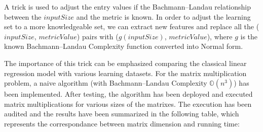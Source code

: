 A trick is used to adjust the entry values if the Bachmann–Landau relationship between the $inputSize$ and the metric is known. In order to adjust the learning set to a more knowledgeable set, we can extract new features and replace all the ($inputSize$, $metricValue$) pairs with ($g(inputSize)$, $metricValue$), where $g$ is the known Bachmann–Landau Complexity function converted into Normal form.


The importance of this trick can be emphasized comparing the classical linear regression model with various learning datasets. For the matrix multiplication problem, a naive algorithm (with Bachmann–Landau Complexity $\mathbb{O}(n^{3})$) has been implemented. After testing, the algorithm has been deployed and executed matrix multiplications for various sizes of the matrixes. The execution has been audited and the results have been summarized in the following table, which represents the correspondance between matrix dimension and running time:

